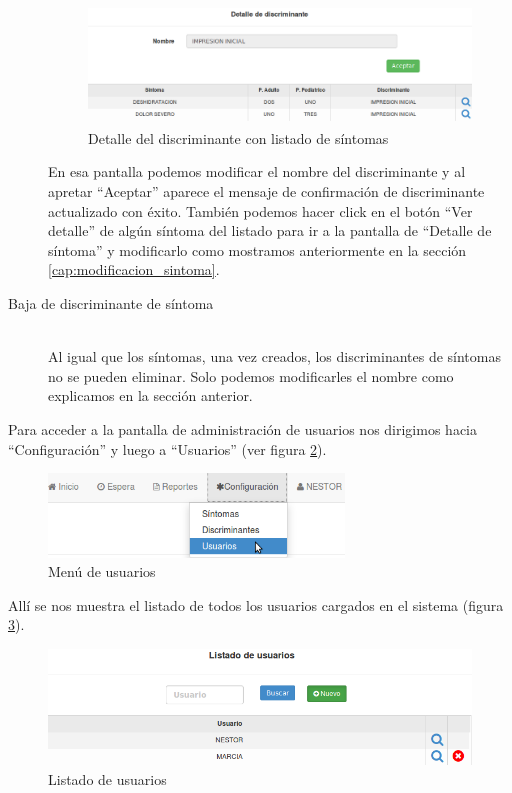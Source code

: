 \begin{description}
\begin{figure}
\centerline{\includegraphics[width=1\textwidth]{listado_sintomas_de_discriminante.png}}
\caption{Detalle del discriminante con listado de síntomas}
\label{fig:detalle_discriminante}
\end{figure}
En esa pantalla podemos modificar el nombre del discriminante y al apretar ``Aceptar'' aparece el mensaje de confirmación de discriminante actualizado con éxito. También podemos hacer click en el botón ``Ver detalle'' de algún síntoma del listado para ir a la pantalla de ``Detalle de síntoma'' y modificarlo como mostramos anteriormente en la sección \ref{cap:modificacion_sintoma}.

\item[Baja de discriminante de síntoma] \mbox{} \\
Al igual que los síntomas, una vez creados, los discriminantes de síntomas no se pueden eliminar. Solo podemos modificarles el nombre como explicamos en la sección anterior.
\end{description}

\label{ABM_usuarios}
Para acceder a la pantalla de administración de usuarios nos dirigimos hacia ``Configuración'' y luego a ``Usuarios'' (ver figura \ref{fig:menu_usuarios}).
\begin{figure}
\centerline{\includegraphics[width=0.7\textwidth]{menu_usuarios.png}}
\caption{Menú de usuarios}
\label{fig:menu_usuarios}
\end{figure}
Allí se nos muestra el listado de todos los usuarios cargados en el sistema (figura \ref{fig:listado_usuarios}).
\begin{figure}
\centerline{\includegraphics[width=1\textwidth]{listado_usuarios.png}}
\caption{Listado de usuarios}
\label{fig:listado_usuarios}
\end{figure}

